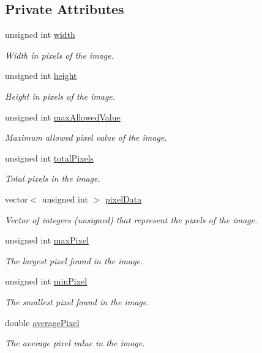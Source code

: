 \subsection*{Private Attributes}
\begin{DoxyCompactItemize}
\item 
unsigned int \hyperlink{class_p_g_m_ae1aba034876f972708f51869f9b96473}{width}
\begin{DoxyCompactList}\small\item\em Width in pixels of the image. \end{DoxyCompactList}\item 
unsigned int \hyperlink{class_p_g_m_a84af85a78cdb18c3f4e40c9668e5144f}{height}
\begin{DoxyCompactList}\small\item\em Height in pixels of the image. \end{DoxyCompactList}\item 
unsigned int \hyperlink{class_p_g_m_a33ac46eb1f698bc6f6d4efec8440c6b7}{max\+Allowed\+Value}
\begin{DoxyCompactList}\small\item\em Maximum allowed pixel value of the image. \end{DoxyCompactList}\item 
unsigned int \hyperlink{class_p_g_m_a01641571253c5af3bced03f9199c2a29}{total\+Pixels}
\begin{DoxyCompactList}\small\item\em Total pixels in the image. \end{DoxyCompactList}\item 
vector$<$ unsigned int $>$ \hyperlink{class_p_g_m_ab195067d405dd4dcb8071a10d98bd31d}{pixel\+Data}
\begin{DoxyCompactList}\small\item\em Vector of integers (unsigned) that represent the pixels of the image. \end{DoxyCompactList}\item 
unsigned int \hyperlink{class_p_g_m_a5bc3b9f648daf505e5c8e86286c9a40f}{max\+Pixel}
\begin{DoxyCompactList}\small\item\em The largest pixel found in the image. \end{DoxyCompactList}\item 
unsigned int \hyperlink{class_p_g_m_ac40e2ebf0447a03a5bd07a4dc5f32223}{min\+Pixel}
\begin{DoxyCompactList}\small\item\em The smallest pixel found in the image. \end{DoxyCompactList}\item 
double \hyperlink{class_p_g_m_a0fa0af24e638fc0393f33d0836930e95}{average\+Pixel}
\begin{DoxyCompactList}\small\item\em The average pixel value in the image. \end{DoxyCompactList}\end{DoxyCompactItemize}



